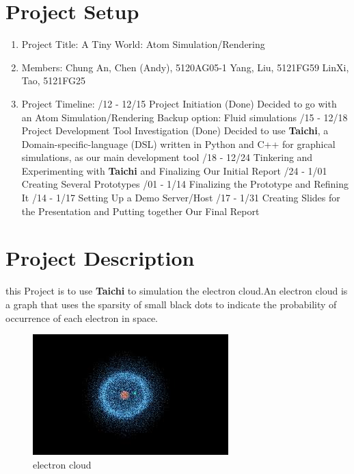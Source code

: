 \documentclass[10pt]{article}
\numberwithin{equation}{section}
\begin{document}
\section{Project Setup}
\begin{enumerate}
    \item Project Title: A Tiny World: Atom Simulation/Rendering
    \item Members:
        \subitem Chung An, Chen (Andy), 5120AG05-1
        \subitem Yang, Liu, 5121FG59
        \subitem LinXi, Tao, 5121FG25
    \item Project Timeline:
        /12 - 12/15 Project Initiation (Done)
            \subsubitem Decided to go with an Atom Simulation/Rendering
            \subsubitem Backup option: Fluid simulations
        /15 - 12/18 Project Development Tool Investigation (Done) 
            \subsubitem Decided to use \textbf{Taichi}, a Domain-specific-language (DSL) written in Python and C++ for graphical simulations, as our main development tool
        /18 - 12/24 Tinkering and Experimenting with \textbf{Taichi} and Finalizing Our Initial Report
        /24 - 1/01 Creating Several Prototypes
        /01 - 1/14 Finalizing the Prototype and Refining It
        /14 - 1/17 Setting Up a Demo Server/Host
        /17 - 1/31 Creating Slides for the Presentation and Putting together Our Final Report
\end{enumerate}
\section{Project Description}
    this Project is to use \textbf{Taichi} to simulation the electron cloud.An electron cloud is a graph that uses the sparsity of small black dots to indicate the probability of occurrence of each electron in space.
    
\begin{figure}[htbp]
  \vspace{10pt} %
  \centering
  \includegraphics[]{./concept_1.jpeg}
  \caption{electron cloud}\label{fig1} %
\end{figure}
\end{document}
